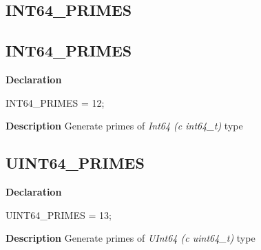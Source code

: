 \documentclass{report}
\newif\ifpdf
\begin{document}
\subsection*{\large{\textbf{INT64{\_}PRIMES}}\normalsize\hspace{1ex}\hrulefill}
\else
\subsection*{INT64{\_}PRIMES}
\fi
\label{primesieve-INT64_PRIMES}
\begin{list}{}{
\setlength{\itemindent}{0cm}
\setlength{\listparindent}{0cm}
\setlength{\leftmargin}{\evensidemargin}
\addtolength{\leftmargin}{\tmplength}
\settowidth{\labelsep}{X}
\addtolength{\leftmargin}{\labelsep}
\setlength{\labelwidth}{\tmplength}
}
\item[\textbf{Declaration}\hfill]
\ifpdf
\begin{flushleft}
\fi
\begin{ttfamily}
INT64{\_}PRIMES = 12;\end{ttfamily}

\ifpdf
\end{flushleft}
\fi

\par
\item[\textbf{Description}]
Generate primes of \textit{Int64 (c int64{\_}t)} type

\end{list}
\ifpdf
\subsection*{\large{\textbf{UINT64{\_}PRIMES}}\normalsize\hspace{1ex}\hrulefill}
\else
\subsection*{UINT64{\_}PRIMES}
\fi
\label{primesieve-UINT64_PRIMES}
\begin{list}{}{
\setlength{\itemindent}{0cm}
\setlength{\listparindent}{0cm}
\setlength{\leftmargin}{\evensidemargin}
\addtolength{\leftmargin}{\tmplength}
\settowidth{\labelsep}{X}
\addtolength{\leftmargin}{\labelsep}
\setlength{\labelwidth}{\tmplength}
}
\item[\textbf{Declaration}\hfill]
\ifpdf
\begin{flushleft}
\fi
\begin{ttfamily}
UINT64{\_}PRIMES = 13;\end{ttfamily}

\ifpdf
\end{flushleft}
\fi

\par
\item[\textbf{Description}]
Generate primes of \textit{UInt64 (c uint64{\_}t)} type

\end{list}
\end{document}
